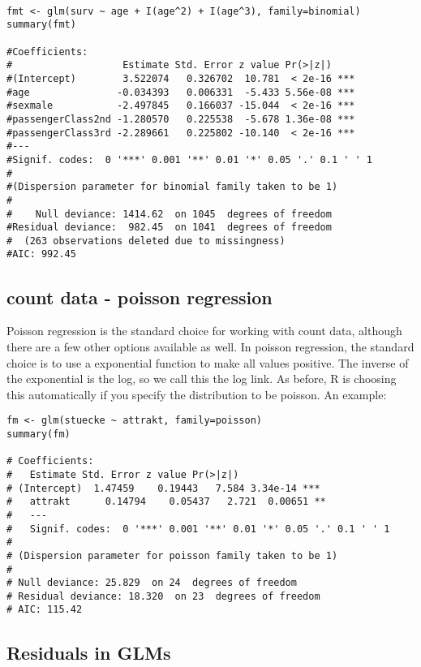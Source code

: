 \documentclass[a4paper,twoside]{tufte-book} %
\begin{document}
\begin{lstlisting}

fmt <- glm(surv ~ age + I(age^2) + I(age^3), family=binomial)
summary(fmt)

#Coefficients:
#                   Estimate Std. Error z value Pr(>|z|)    
#(Intercept)        3.522074   0.326702  10.781  < 2e-16 ***
#age               -0.034393   0.006331  -5.433 5.56e-08 ***
#sexmale           -2.497845   0.166037 -15.044  < 2e-16 ***
#passengerClass2nd -1.280570   0.225538  -5.678 1.36e-08 ***
#passengerClass3rd -2.289661   0.225802 -10.140  < 2e-16 ***
#---
#Signif. codes:  0 '***' 0.001 '**' 0.01 '*' 0.05 '.' 0.1 ' ' 1
#
#(Dispersion parameter for binomial family taken to be 1)
#
#    Null deviance: 1414.62  on 1045  degrees of freedom
#Residual deviance:  982.45  on 1041  degrees of freedom
#  (263 observations deleted due to missingness)
#AIC: 992.45

\end{lstlisting}


\subsection{count data - poisson regression}

Poisson regression is the standard choice for working with count data, although there are a few other options available as well. In poisson regression, the standard choice is to use a exponential function to make all values positive. The inverse of the exponential is the log, so we call this the log link. As before, R is choosing this automatically if you specify the distribution to be poisson. An example:

\begin{lstlisting}
fm <- glm(stuecke ~ attrakt, family=poisson)
summary(fm)

# Coefficients:
#   Estimate Std. Error z value Pr(>|z|)    
# (Intercept)  1.47459    0.19443   7.584 3.34e-14 ***
#   attrakt      0.14794    0.05437   2.721  0.00651 ** 
#   ---
#   Signif. codes:  0 '***' 0.001 '**' 0.01 '*' 0.05 '.' 0.1 ' ' 1
# 
# (Dispersion parameter for poisson family taken to be 1)
# 
# Null deviance: 25.829  on 24  degrees of freedom
# Residual deviance: 18.320  on 23  degrees of freedom
# AIC: 115.42
\end{lstlisting}

\subsection{Residuals in GLMs}
\end{document}
